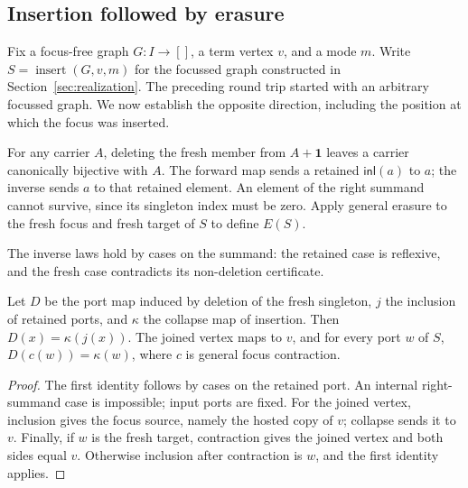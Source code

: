 \subsection{Insertion followed by erasure}
\label{sec:insertion-cancellation}
Fix a focus-free graph $G:I\to[]$, a term vertex $v$, and a mode $m$.
Write $S=\operatorname{insert}(G,v,m)$ for the focussed graph constructed
in Section~\ref{sec:realization}. The preceding round trip started with an
arbitrary focussed graph. We now establish the opposite direction, including
the position at which the focus was inserted.

\begin{definition}
For any carrier $A$, deleting the fresh member from $A+\mathbf1$ leaves a
carrier canonically bijective with $A$. The forward map sends a retained
$\mathsf{inl}(a)$ to $a$; the inverse sends $a$ to that retained element.
An element of the right summand cannot survive, since its singleton index
must be zero. Apply general erasure to the fresh focus and fresh target of
$S$ to define $E(S)$.
\end{definition}
The inverse laws hold by cases on the summand: the retained case is reflexive,
and the fresh case contradicts its non-deletion certificate.

\begin{lemma}
Let $D$ be the port map induced by deletion of the fresh singleton, $j$ the
inclusion of retained ports, and $\kappa$ the collapse map of insertion.
Then $D(x)=\kappa(j(x))$. The joined vertex maps to $v$, and for every port
$w$ of $S$, $D(c(w))=\kappa(w)$, where $c$ is general focus contraction.
\end{lemma}
\begin{proof}
The first identity follows by cases on the retained port. An internal
right-summand case is impossible; input ports are fixed. For the joined
vertex, inclusion gives the focus source, namely the hosted copy of $v$;
collapse sends it to $v$. Finally, if $w$ is the fresh target, contraction
gives the joined vertex and both sides equal $v$. Otherwise inclusion after
contraction is $w$, and the first identity applies.
\end{proof}

